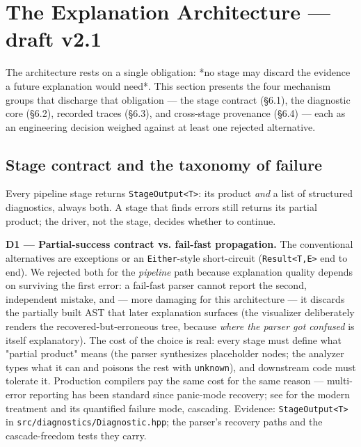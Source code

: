 \section{The Explanation Architecture --- draft v2.1}
\label{sec:architecture}



The architecture rests on a single obligation: *no stage may discard
the evidence a future explanation would need*. This section presents
the four mechanism groups that discharge that obligation --- the stage
contract (\S6.1), the diagnostic core (\S6.2), recorded traces (\S6.3),
and cross-stage provenance (\S6.4) --- each as an engineering decision
weighed against at least one rejected alternative.

\subsection{Stage contract and the taxonomy of failure}

Every pipeline stage returns \texttt{StageOutput<T>}: its product \emph{and} a
list of structured diagnostics, always both. A stage that finds
errors still returns its partial product; the driver, not the stage,
decides whether to continue.

\textbf{D1 --- Partial-success contract vs. fail-fast propagation.} The
conventional alternatives are exceptions or an \texttt{Either}-style
short-circuit (\texttt{Result<T,E>} end to end). We rejected both for the
\emph{pipeline} path because explanation quality depends on surviving the
first error: a fail-fast parser cannot report the second, independent
mistake, and --- more damaging for this architecture --- it discards the
partially built AST that later explanation surfaces (the visualizer
deliberately renders the recovered-but-erroneous tree, because
\emph{where the parser got confused} is itself explanatory). The cost of
the choice is real: every stage must define what "partial product"
means (the parser synthesizes placeholder nodes; the analyzer types
what it can and poisons the rest with \texttt{unknown}), and downstream code
must tolerate it. Production compilers pay the same cost for the same
reason --- multi-error reporting has been standard since panic-mode
recovery; see \cite{diekmann2020dont} for the modern treatment and its quantified
failure mode, cascading. Evidence: \texttt{StageOutput<T>} in
\texttt{src/diagnostics/Diagnostic.hpp}; the parser's recovery paths and the
cascade-freedom tests they carry.

